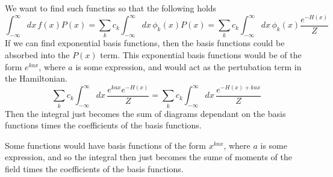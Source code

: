 \documentclass[letterpaper,12pt]{article}
\begin{document}
We want to find such functins so that the following holds
\begin{equation}
    \int_{-\infty}^{\infty} dx \, f(x)P(x) = \sum_{k} c_{k}\int_{-\infty}^{\infty} dx \, \phi_{k}(x)P(x) = \sum_{k} c_{k}\int_{-\infty}^{\infty} dx \, \phi_{k}(x)\frac{e^{-H(x)}}{Z}
\end{equation}
If we can find exponential basis functions, then the basis functions could be absorbed into the $P(x)$ term.
This exponential basis functions would be of the form $e^{kax}$, where $a$ is some expression, and would act as the pertubation term in the Hamiltonian.
\begin{equation}
    \sum_{k} c_{k}\int_{-\infty}^{\infty} dx \, \frac{e^{kax}e^{-H(x)}}{Z} = \sum_{k} c_{k}\int_{-\infty}^{\infty} dx \, \frac{e^{-H(x) + kax}}{Z}
\end{equation}
Then the integral just becomes the sum of diagrams dependant on the basis functions times the coefficients of the basis functions.

\vspace*{0.5cm}
Some functions would have basis functions of the form $x^{kax}$, where $a$ is some expression, and so the integral then just becomes the sume of moments of the field times the coefficients of the basis functions.
\end{document}
